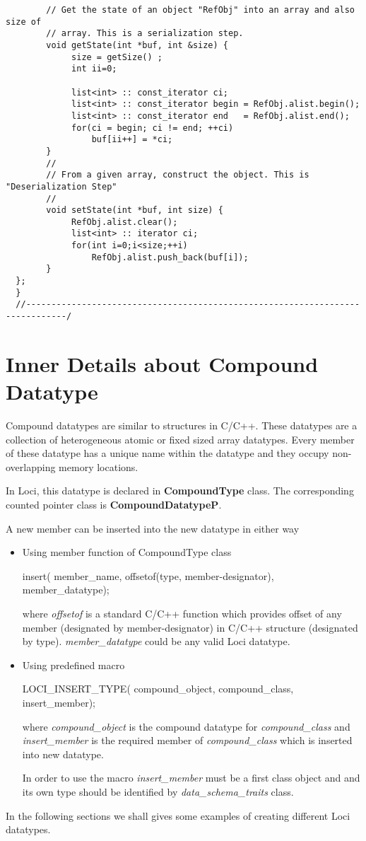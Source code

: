 \begin{verbatim}
        // Get the state of an object "RefObj" into an array and also size of
        // array. This is a serialization step. 
        void getState(int *buf, int &size) {
             size = getSize() ;
             int ii=0;

             list<int> :: const_iterator ci;
             list<int> :: const_iterator begin = RefObj.alist.begin();
             list<int> :: const_iterator end   = RefObj.alist.end();
             for(ci = begin; ci != end; ++ci) 
                 buf[ii++] = *ci;
        }
        //
        // From a given array, construct the object. This is "Deserialization Step"
        //
        void setState(int *buf, int size) {
             RefObj.alist.clear();
             list<int> :: iterator ci;
             for(int i=0;i<size;++i)
                 RefObj.alist.push_back(buf[i]);
        }
  };
  }
  //------------------------------------------------------------------------------/
\end{verbatim}
%
%
\section{Inner Details about Compound Datatype}
Compound datatypes are similar to structures in C/C++. These datatypes
are a collection of heterogeneous atomic or fixed sized array datatypes. 
Every member of these datatype has a unique name within the datatype and 
they occupy  non-overlapping memory locations.
%
%
\par In Loci, this datatype is declared in {\bf CompoundType}
class. The corresponding counted pointer class is {\bf
CompoundDatatypeP}.
%
\par A new member can be inserted into the new datatype in either way
\begin{itemize}
\item Using member function of CompoundType class
\begin{center}
insert( member\_name, offsetof(type, member-designator), member\_datatype);
\end{center}
where {\em offsetof} is a standard C/C++ function which provides offset of any
member (designated by member-designator) in C/C++ structure (designated by type).
{\em member\_datatype} could be any valid Loci datatype.
%
\item Using predefined macro
\begin{center}
LOCI\_INSERT\_TYPE( compound\_object, compound\_class, insert\_member);
\end{center}
\par where {\em compound\_object} is the compound datatype for {\em compound\_class}
and {\em insert\_member} is the required member of {\em compound\_class} which
is inserted into new datatype. 
\par In order to use the macro {\em insert\_member} must be a first class object
and and its own type should be identified by {\em data\_schema\_traits} class.
\end{itemize}
\par In the following sections we shall gives some examples of
creating different Loci datatypes.
%
